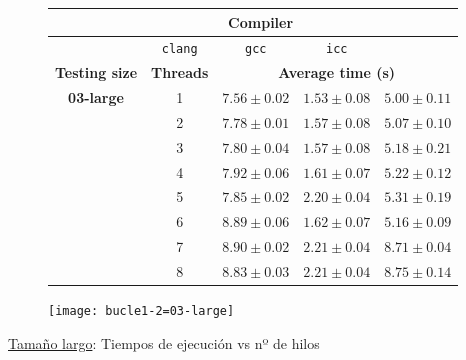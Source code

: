 \begin{figure}[H]
    \centering
    \begin{subfigure}{0.4\textwidth}
        \begin{adjustbox}{width=\textwidth} 
        \begin{tabular}{|c|c|c|c|c|}
            \hline
            \rowcolor{azul} \multicolumn{2}{|c|}{}&\multicolumn{3}{c|}{\textbf{Compiler}} \\ \hline
            \rowcolor{azul} \multicolumn{2}{|c|}{}&\texttt{clang}&\texttt{gcc}&\texttt{icc}\\ \hline
            \rowcolor{azul} \textbf{Testing size} & \textbf{Threads}&\multicolumn{3}{c|}{\textbf{Average time (s)}} \\ \hline
            \multirow{8}{1cm}{\textbf{03-large}} & 1 & \(7.56\pm{0.02}\) & \(1.53\pm{0.08}\) & \(5.00\pm{0.11}\) \\ \cline{2-5}
            & 2 & \(7.78\pm{0.01}\) & \(1.57\pm{0.08}\) & \(5.07\pm{0.10}\) \\ \cline{2-5}
            & 3 & \(7.80\pm{0.04}\) & \(1.57\pm{0.08}\) & \(5.18\pm{0.21}\) \\ \cline{2-5}
            & 4 & \(7.92\pm{0.06}\) & \(1.61\pm{0.07}\) & \(5.22\pm{0.12}\) \\ \cline{2-5}
            & 5 & \(7.85\pm{0.02}\) & \(2.20\pm{0.04}\) & \(5.31\pm{0.19}\) \\ \cline{2-5}
            & 6 & \(8.89\pm{0.06}\) & \(1.62\pm{0.07}\) & \(5.16\pm{0.09}\) \\ \cline{2-5}
            & 7 & \(8.90\pm{0.02}\) & \(2.21\pm{0.04}\) & \(8.71\pm{0.04}\) \\ \cline{2-5}
            & 8 & \(8.83\pm{0.03}\) & \(2.21\pm{0.04}\) & \(8.75\pm{0.14}\) \\ \hline
        \end{tabular}
        \end{adjustbox}
    \end{subfigure}
    \hfill
    \begin{subfigure}{0.5\textwidth}
        \texttt{[image: bucle1-2=03-large]}
    \end{subfigure}
    \caption{\underline{Tamaño largo}: Tiempos de ejecución vs nº de hilos}
    \label{bucle1-2=03-large}
\end{figure}

